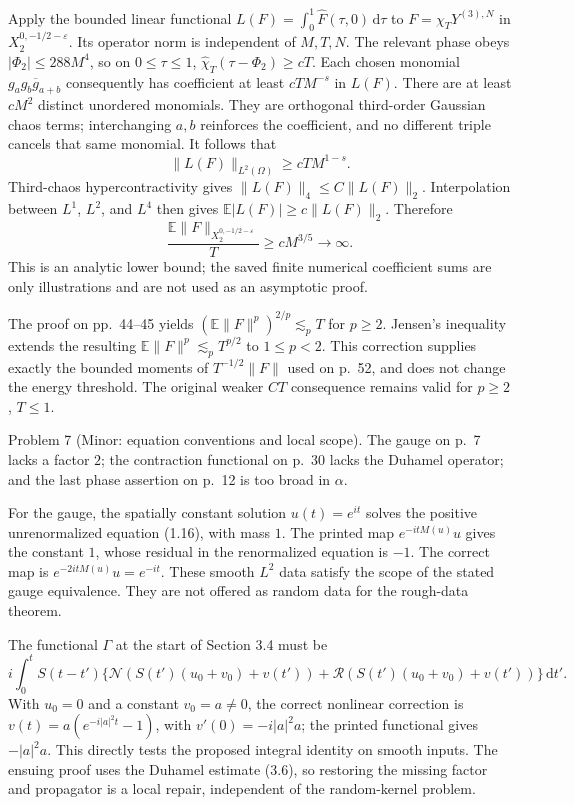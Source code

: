 \documentclass[10pt]{article}
\begin{document}
Apply the bounded linear functional \(L(F)=\int_0^1\widehat F(\tau,0)\,\mathrm d\tau\) to \(F=\chi_TY^{(3),N}\) in \(X_2^{0,-1/2-\varepsilon}\). Its operator norm is independent of \(M,T,N\). The relevant phase obeys \(|\Phi_2|\le288M^4\), so on \(0\le\tau\le1\), \(\widehat\chi_T(\tau-\Phi_2)\ge cT\). Each chosen monomial \(g_ag_b\overline g_{a+b}\) consequently has coefficient at least \(cTM^{-s}\) in \(L(F)\). There are at least \(cM^2\) distinct unordered monomials. They are orthogonal third-order Gaussian chaos terms; interchanging \(a,b\) reinforces the coefficient, and no different triple cancels that same monomial. It follows that \[\|L(F)\|_{L^2(\Omega)}\ge cTM^{1-s}.\] Third-chaos hypercontractivity gives \(\|L(F)\|_4\le C\|L(F)\|_2\). Interpolation between \(L^1\), \(L^2\), and \(L^4\) then gives \(\mathbb E|L(F)|\ge c\|L(F)\|_2\). Therefore \[\frac{\mathbb E\|F\|_{X_2^{0,-1/2-\varepsilon}}}{T}
 \ge cM^{3/5}\longrightarrow\infty.\] This is an analytic lower bound; the saved finite numerical coefficient sums are only illustrations and are not used as an asymptotic proof.\par
The proof on pp. 44–45 yields \((\mathbb E\|F\|^p)^{2/p}\lesssim_pT\) for \(p\ge2\). Jensen’s inequality extends the resulting \(\mathbb E\|F\|^p\lesssim_pT^{p/2}\) to \(1\le p<2\). This correction supplies exactly the bounded moments of \(T^{-1/2}\|F\|\) used on p. 52, and does not change the energy threshold. The original weaker \(CT\) consequence remains valid for \(p\ge2\), \(T\le1\).\par
Problem 7 (Minor: equation conventions and local scope).  The gauge on p. 7 lacks a factor \(2\); the contraction functional on p. 30 lacks the Duhamel operator; and the last phase assertion on p. 12 is too broad in \(\alpha\).\par
For the gauge, the spatially constant solution \(u(t)=e^{it}\) solves the positive unrenormalized equation (1.16), with mass \(1\). The printed map \(e^{-itM(u)}u\) gives the constant \(1\), whose residual in the renormalized equation is \(-1\). The correct map is \(e^{-2itM(u)}u=e^{-it}\). These smooth \(L^2\) data satisfy the scope of the stated gauge equivalence. They are not offered as random data for the rough-data theorem.\par
The functional \(\Gamma\) at the start of Section 3.4 must be \[i\int_0^t S(t-t')
  \{\mathcal N(S(t')(u_0+v_0)+v(t'))+
      \mathcal R(S(t')(u_0+v_0)+v(t'))\}\,\mathrm dt'.\] With \(u_0=0\) and a constant \(v_0=a\ne0\), the correct nonlinear correction is \(v(t)=a(e^{-i|a|^2t}-1)\), with \(v'(0)=-i|a|^2a\); the printed functional gives \(-|a|^2a\). This directly tests the proposed integral identity on smooth inputs. The ensuing proof uses the Duhamel estimate (3.6), so restoring the missing factor and propagator is a local repair, independent of the random-kernel problem.\par
\end{document}
